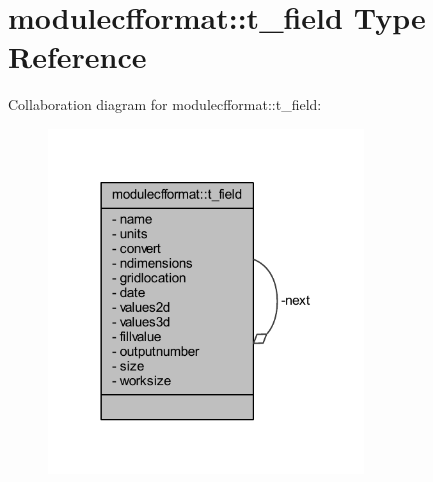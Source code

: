 \hypertarget{structmodulecfformat_1_1t__field}{}\section{modulecfformat\+:\+:t\+\_\+field Type Reference}
\label{structmodulecfformat_1_1t__field}


Collaboration diagram for modulecfformat\+:\+:t\+\_\+field\+:\nopagebreak
\begin{figure}[H]
\begin{center}
\leavevmode
\includegraphics[width=237pt]{structmodulecfformat_1_1t__field__coll__graph}
\end{center}
\end{figure}
